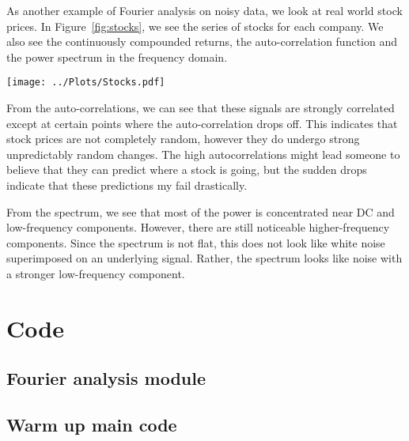 \documentclass[twocolumn]{myarticle}
\begin{document}
As another example of Fourier analysis on noisy data, we look at real world stock prices.
In Figure~\ref{fig:stocks}, we see the series of stocks for each company.
We also see the continuously compounded returns, the auto-correlation function and the power spectrum in the frequency domain.

\begin{figure*}[htpb]
    \centering
    \texttt{[image: ../Plots/Stocks.pdf]}
    \caption{Analysis of real world stock prices.}
    \label{fig:stocks}
\end{figure*}

From the auto-correlations, we can see that these signals are strongly correlated except at certain points where the auto-correlation drops off.
This indicates that stock prices are not completely random, however they do undergo strong unpredictably random changes.
The high autocorrelations might lead someone to believe that they can predict where a stock is going, but the sudden drops indicate that these predictions my fail drastically.

From the spectrum, we see that most of the power is concentrated near DC and low-frequency components.
However, there are still noticeable higher-frequency components.
Since the spectrum is not flat, this does not look like white noise superimposed on an underlying signal.
Rather, the spectrum looks like noise with a stronger low-frequency component.

\onecolumn

\section{Code}
\label{sec:code}

\subsection{Fourier analysis module}
\label{subsec:fourier_analysis_module}


\vspace{10pt}

\subsection{Warm up main code}
\label{subsec:warm_up_main_code}


\vspace{10pt}
\end{document}
